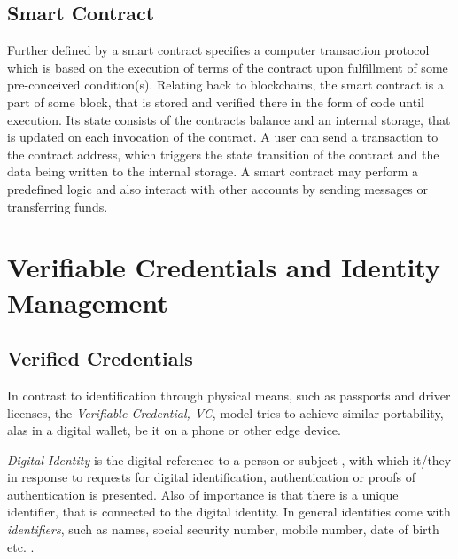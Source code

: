 \subsection{Smart Contract} %
\label{sec:Smart Contract}
Further defined by \cite{diam-iot-2020} a smart contract specifies a computer transaction protocol which is based on the
execution of terms of the contract upon fulfillment of some pre-conceived condition(s).
Relating back to blockchains, the smart contract is a part of some block, that is stored and verified there in the form
of code until execution. Its state consists of the contracts balance and an internal storage, that is updated on each
invocation of the contract. A user can send a transaction to the contract address, which triggers the state transition
of the contract and the data being written to the internal storage. A smart contract may perform a predefined logic and
also interact with other accounts by sending messages or transferring funds.

\section{Verifiable Credentials and Identity Management} %
\label{sec:Verifiable Credentials and Identity Management}

\subsection{Verified Credentials} %
\label{sub:Verified Credentials}
In contrast to identification through physical means, such as passports and driver licenses, the
\textit{Verifiable Credential, VC}, model tries to achieve similar portability, alas in a digital wallet, be it on a
phone or other edge device. \cite{w3c2019verifiablecredentials}

\textit{Digital Identity} is the digital reference to a person or subject \cite{Domingo_2020}, with which it/they in
response to requests for digital identification, authentication or proofs of authentication is presented. Also of
importance is that there is a unique identifier, that is connected to the digital identity.
\cite{Sedlmeir_Smethurst_Rieger_Fridgen_2021}
In general identities come with \textit{identifiers}, such as names, social security number, mobile number, date of
birth etc. \cite{eth-decentralized-identity}.

